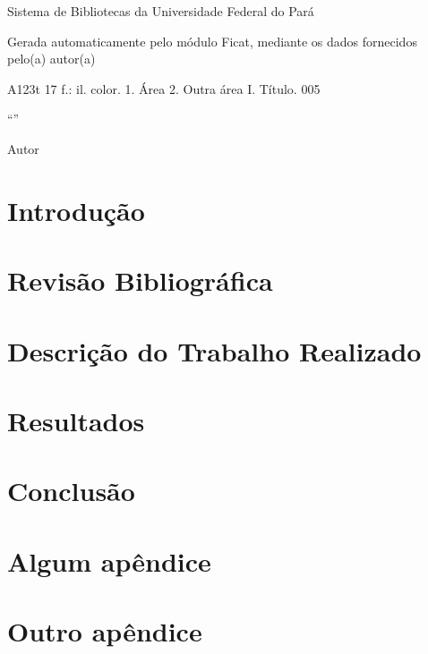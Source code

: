 \documentclass{../ufpatcc}
\begin{document}
  \capa
  \folhaderosto
                      {Sistema de Bibliotecas da Universidade Federal do Pará\par{}Gerada automaticamente pelo módulo Ficat, mediante os dados fornecidos pelo(a) autor(a)}
                      {A123t}
                      {17 f.: il. color.}
                      {1. Área 2. Outra área I. Título.}
                      {005}
  \folhadeaprovacao{\today}
  \begin{dedicatoria}
    \lipsum[13]
  \end{dedicatoria}
  \begin{agradecimentos}
    \lipsum[1-5]
  \end{agradecimentos}
  \begin{epigrafe}
    ``\lipsum*[101]''\par
      Autor
  \end{epigrafe}
  \begin{resumo}
    \lipsum[1]
  \end{resumo}
  \begin{abstract}
    \lipsum[1]
  \end{abstract}
  \tableofcontents

  \chapter*{Introdução}
  \chapter{Revisão Bibliográfica} %
    \lipsum[1]\cite{atalholivro}
    \lipsum[2]\cite{atalhoonline}
  \chapter{Descrição do Trabalho Realizado}
  \chapter{Resultados}
  \chapter*{Conclusão}

  \appendix
    \chapter{Algum apêndice}
    \chapter{Outro apêndice}
\end{document}
